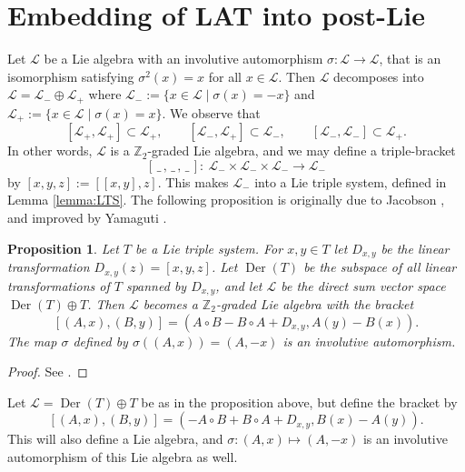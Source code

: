 \documentclass[10pt,a4paper]{amsart}
\newcommand{\Der}{\operatorname{Der}}
\newcommand{\noarg}{\,\_\,}
\numberwithin{equation}{section}
\newtheorem{Proposition}[Theorem]{Proposition}
 { \theoremstyle{definition}
\newtheorem{Definition}[Theorem]{Definition}
\newtheorem{Note}[Theorem]{Note}
\newtheorem{Example}[Theorem]{Example}
\newtheorem{Remark}[Theorem]{Remark} }
\begin{document}
\section{Embedding of LAT into post-Lie}\label{sec:PL-emb}

Let $\mathcal{L}$ be a Lie algebra with an involutive automorphism $\sigma \colon \mathcal{L} \rightarrow \mathcal{L}$, that is an isomorphism satisfying $\sigma^2(x) = x$ for all $x \in \mathcal{L}$. Then $\mathcal{L}$ decomposes into $\mathcal{L} = \mathcal{L}_- \oplus \mathcal{L}_+$ where $\mathcal{L}_- := \{ x \in \mathcal{L} \mid \sigma(x) = -x \}$ and $\mathcal{L}_+ := \{ x \in \mathcal{L} \mid \sigma(x) = x \}$. We observe that
\[
[\mathcal{L}_+ , \mathcal{L}_+] \subset \mathcal{L}_+, \qquad [\mathcal{L}_- , \mathcal{L}_+] \subset \mathcal{L}_-, \qquad [\mathcal{L}_- , \mathcal{L}_- ] \subset \mathcal{L}_+.
\]
In other words, $\mathcal{L}$ is a $\mathbb{Z}_2$-graded Lie algebra, and we may define a triple-bracket
\[
[\noarg, \noarg, \noarg ] \colon \ \mathcal{L}_- \times \mathcal{L}_- \times \mathcal{L}_- \rightarrow \mathcal{L}_-
\]
by $[x,y,z] := [[x,y],z]$. This makes $\mathcal{L}_-$ into a Lie triple system, defined in Lemma \ref{lemma:LTS}. The following proposition is originally due to Jacobson \cite{Jacobson1951}, and improved by Yamaguti \cite{yamaguti1957}.

\begin{Proposition}\label{prop:LTSembedding}
Let $T$ be a Lie triple system. For $x,y \in T$ let $D_{x,y}$ be the linear transformation $D_{x,y}(z) = [x,y,z]$. Let $\Der(T)$ be the subspace of all linear transformations of $T$ spanned by $D_{x,y}$, and let $\mathcal{L}$ be the direct sum vector space $\Der(T) \oplus T$. Then $\mathcal{L}$ becomes a $\mathbb{Z}_2$-graded Lie algebra with the bracket
\[
[(A,x),(B,y)] = (A\circ B - B \circ A + D_{x,y} , A(y) - B(x)).
\]
The map $\sigma$ defined by $\sigma((A,x)) = (A,-x)$ is an involutive automorphism.
\end{Proposition}

\begin{proof}
See \cite[Proposition 2.3]{Loos1}.
\end{proof}


\begin{Remark}\label{rmrk:82}
Let $\mathcal{L} = \Der(T) \oplus T$ be as in the proposition above, but define the bracket by
\[
[(A,x),(B,y)] = (-A\circ B + B \circ A + D_{x,y}, B(x) - A(y)).
\]
This will also define a Lie algebra, and $\sigma\colon (A,x) \mapsto (A,-x)$ is an involutive automorphism of this Lie algebra as well.
\end{Remark}
\end{document}
